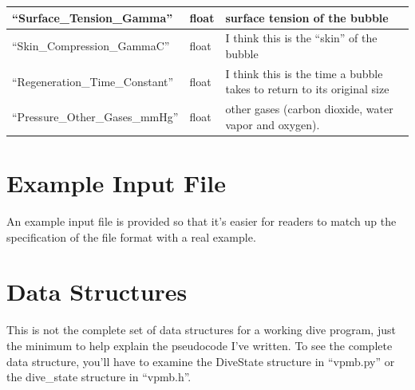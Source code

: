 \documentclass[12pt]{article}
\begin{document}
\begin{longtable}{|l|l|p{5cm}|}
\hline
 ``Surface\_Tension\_Gamma''           &  float                                                                                            &  surface tension of the bubble                                                            \\
\hline
 ``Skin\_Compression\_GammaC''         &  float                                                                                            &  I think this is the ``skin'' of the bubble                                               \\
\hline
 ``Regeneration\_Time\_Constant''      &  float                                                                                            &  I think this is the time a bubble takes to return to its original size                   \\
\hline
 ``Pressure\_Other\_Gases\_mmHg''      &  float                                                                                            &  other gases (carbon dioxide, water vapor and oxygen).                                    \\
\hline
\end{longtable}

\newpage
\section{Example Input File}

An example input file is provided so that it's easier for readers to match up
the specification of the file format with a real example.

\label{inputfile}


\newpage
\section{Data Structures}

This is not the complete set of data structures for a working dive program, just the minimum to help explain the
pseudocode I've written. To see the complete data structure, you'll have to examine the DiveState structure
in ``vpmb.py'' or the dive\_state structure in ``vpmb.h''.
\end{document}

